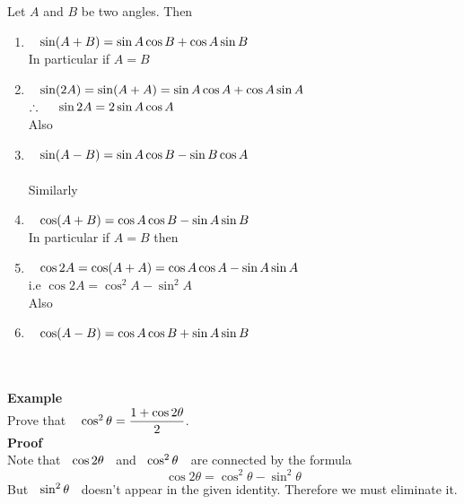 \documentclass[11pt,a4paper]{article}
\begin{document}
Let $A$ and $B$ be two angles. Then
\begin{enumerate}
\item[$*$] $\hspace{0.3cm}\sin (A + B) = \sin A \cos B + \cos A \sin B$\\

In particular if $A = B$

\item[$*$] $\hspace{0.3cm} \sin (2A) = \sin (A+ A) = \sin A \cos A + \cos A \sin A$\\

$\therefore\hspace{0.5cm} \sin 2A = 2\sin A \cos A$\\

Also
\item[$*$] $\hspace{0.3cm}\sin (A - B) = \sin A \cos B - \sin B \cos A$\\\\

Similarly
\item[$*$] $\hspace{0.3cm} \cos (A + B) = \cos A \cos B - \sin A \sin B$\\

In particular if $A=B$ then

\item[$*$] $\hspace{0.3cm} \cos 2A = \cos (A + A) = \cos A \cos A - \sin A \sin A$\\

i.e $\cos 2A = \cos^2A - \sin^2 A$\\


Also
\item[$*$] $\hspace{0.3cm} \cos ( A - B) = \cos A\cos B + \sin A \sin B$\\\\\\
\end{enumerate}









\textbf{Example}\\
Prove that $\hspace{0.3cm}\cos^2\theta =  \dfrac{1 + \cos 2\theta}{2}$.\\


\textbf{Proof}\\
Note that $\hspace{0.2cm} \cos 2\theta\hspace{0.2cm}$ and $\hspace{0.2cm}\cos^2\theta\hspace{0.2cm}$ are connected by the formula $$\cos 2\theta = \cos^2\theta - \sin^2\theta$$
But $\hspace{0.2cm}\sin^2\theta\hspace{0.2cm}$ doesn't appear in the given identity. Therefore we must eliminate it.\\
\end{document}

